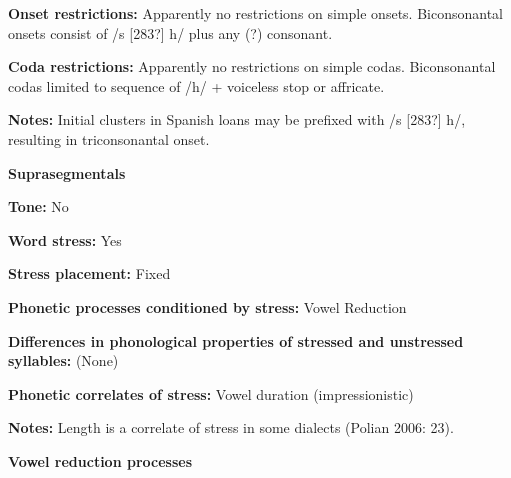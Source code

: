 \begin{styleBody}
\textbf{Onset restrictions:} Apparently no restrictions on simple onsets. Biconsonantal onsets consist of /s [283?] h/ plus any (?) consonant.
\end{styleBody}

\begin{styleBody}
\textbf{Coda restrictions: }Apparently no restrictions on simple codas. Biconsonantal codas limited to sequence of /h/ + voiceless stop or affricate.
\end{styleBody}

\begin{styleBody}
\textbf{Notes: }Initial clusters in Spanish loans may be prefixed with /s [283?] h/, resulting in triconsonantal onset.
\end{styleBody}

\begin{styleBody}
\textbf{Suprasegmentals}
\end{styleBody}

\begin{styleBody}
\textbf{Tone:} No
\end{styleBody}

\begin{styleBody}
\textbf{Word stress:} Yes
\end{styleBody}

\begin{styleBody}
\textbf{Stress placement:} Fixed
\end{styleBody}

\begin{styleBody}
\textbf{Phonetic processes conditioned by stress:} Vowel Reduction
\end{styleBody}

\begin{styleBody}
\textbf{Differences in phonological properties of stressed and unstressed syllables:} (None)
\end{styleBody}

\begin{styleBody}
\textbf{Phonetic correlates of stress: }Vowel duration (impressionistic)
\end{styleBody}

\begin{styleBody}
\textbf{Notes: }Length is a correlate of stress in some dialects (Polian 2006: 23).
\end{styleBody}

\begin{styleBody}
\textbf{Vowel reduction processes}
\end{styleBody}

